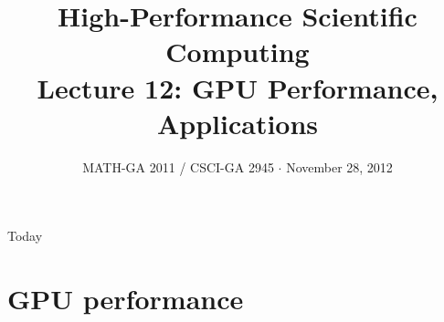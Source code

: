 \documentclass[english,compress]{beamer}
\begin{document}

\title{High-Performance Scientific Computing\\Lecture 12: GPU Performance, Applications}

\date{MATH-GA 2011 / CSCI-GA 2945 $\cdot$ November 28, 2012}

\frame{\titlepage}

\begin{frame}{Today}
  \tableofcontents[hideallsubsections]
\end{frame}
\begin{comment}
\begin{frame}{Bits and pieces}
  \begin{itemize}
    \item Don't have a project? Let's fix that \emph{very soon}
    \item HW5: soon
    \item HW6: due today
    \item Dec 5: Last day of regular class
    \item Dec 12: Legislative Day
    \item Dec 17/18/\textbf{19}: Project presentations
    \item Don't have grade reports for HW1\dots4? Talk to me
  \end{itemize}
\end{frame}
\end{comment}

\section{GPU performance}
\end{document}
